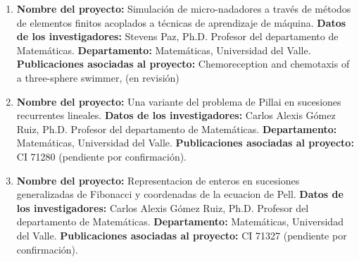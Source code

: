 \begin{spacing}{1.5}
\begin{enumerate}
    \item \textbf{Nombre del proyecto:} Simulación de micro-nadadores a
          través de métodos de elementos finitos acoplados a técnicas de aprendizaje de
          máquina. \newline
          \textbf{Datos de los investigadores:} \newline
          Stevens Paz, Ph.D. Profesor del departamento de Matemáticas. \newline
          \textbf{Departamento: } Matemáticas, Universidad del Valle. \newline
          \textbf{Publicaciones asociadas al proyecto: } \newline Chemoreception
          and chemotaxis of a three-sphere swimmer, (en revisión)\newpage

    \item \textbf{Nombre del proyecto:} Una variante del problema de Pillai en sucesiones recurrentes lineales. \newline
          \textbf{Datos de los investigadores:} \newline
          Carlos Alexis Gómez Ruiz, Ph.D. Profesor del departamento de Matemáticas. \newline
          \textbf{Departamento: } Matemáticas, Universidad del Valle. \newline
          \textbf{Publicaciones asociadas al proyecto: } \newline CI 71280 (pendiente por confirmación).

    \item \textbf{Nombre del proyecto:} Representacion de enteros en sucesiones generalizadas de Fibonacci y coordenadas de la ecuacion de Pell. \newline
          \textbf{Datos de los investigadores:} \newline
          Carlos Alexis Gómez Ruiz, Ph.D. Profesor del departamento de Matemáticas. \newline
          \textbf{Departamento: } Matemáticas, Universidad del Valle. \newline
          \textbf{Publicaciones asociadas al proyecto: } \newline CI 71327 (pendiente por confirmación).

  \end{enumerate}

  \mylinespacing
  \mylinespacing
  \begin{tightcenter}
  \end{tightcenter}
\end{spacing}